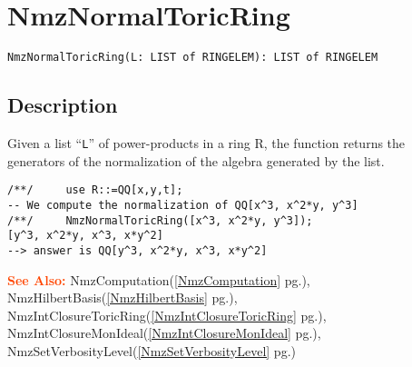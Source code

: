 \documentclass[a4paper]{mybook}
\newenvironment{command}{}{} %
\newcommand\SeeAlso{\par\textcolor{OrangeRed}{\textbf{\large See Also: }}}
\begin{document}
\section{NmzNormalToricRing}
\label{NmzNormalToricRing}
\begin{command} %


\begin{Verbatim}[label=syntax, rulecolor=\color{MidnightBlue},
frame=single]
NmzNormalToricRing(L: LIST of RINGELEM): LIST of RINGELEM
\end{Verbatim}


\subsection*{Description}

Given a list ``\verb&L&'' of power-products in a ring R, the function returns the
generators of the normalization of the algebra generated by the list.
\begin{Verbatim}[label=example, rulecolor=\color{PineGreen}, frame=single]
/**/     use R::=QQ[x,y,t];
-- We compute the normalization of QQ[x^3, x^2*y, y^3]
/**/     NmzNormalToricRing([x^3, x^2*y, y^3]);
[y^3, x^2*y, x^3, x*y^2]
--> answer is QQ[y^3, x^2*y, x^3, x*y^2]
\end{Verbatim}


\SeeAlso %
  NmzComputation(\ref{NmzComputation} pg.\pageref{NmzComputation}), 
    NmzHilbertBasis(\ref{NmzHilbertBasis} pg.\pageref{NmzHilbertBasis}), 
    NmzIntClosureToricRing(\ref{NmzIntClosureToricRing} pg.\pageref{NmzIntClosureToricRing}), 
    NmzIntClosureMonIdeal(\ref{NmzIntClosureMonIdeal} pg.\pageref{NmzIntClosureMonIdeal}), 
    NmzSetVerbosityLevel(\ref{NmzSetVerbosityLevel} pg.\pageref{NmzSetVerbosityLevel})
\end{command} %
\end{document}
